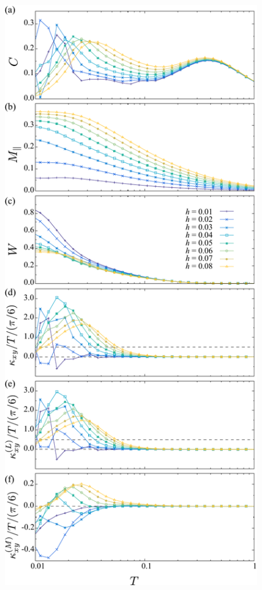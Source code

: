 \documentclass[twocolumn,superscriptaddress,showpacs, longbibliography, aps, prb]{revtex4-2}
\begin{document}
\begin{figure}
  \begin{center}
    \includegraphics[width=0.9\linewidth]{Figs/plot_CMWkT.pdf}

\end{center}
\end{figure}
\end{document}

